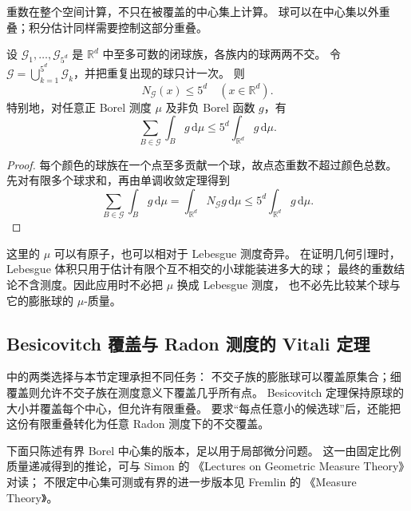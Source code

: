 重数在整个空间计算，不只在被覆盖的中心集上计算。
球可以在中心集以外重叠；积分估计同样需要控制这部分重叠。

\begin{corollary}\label{b1:cor:besicovitch-multiplicity}
设 \(\mathcal G_1,\ldots,\mathcal G_{5^d}\) 是 \(\mathbb R^d\) 中至多可数的闭球族，各族内的球两两不交。
令 \(\mathcal G=\bigcup_{k=1}^{5^d}\mathcal G_k\)，并把重复出现的球只计一次。
则
\[
 N_{\mathcal G}(x)\leq5^d\quad(x\in\mathbb R^d).
\]
特别地，对任意正 Borel 测度 \(\mu\) 及非负 Borel 函数 \(g\)，有
\[
 \sum_{B\in\mathcal G}\int_B g\,\mathrm{d}\mu
 \leq5^d\int_{\mathbb R^d}g\,\mathrm{d}\mu.
\]
\end{corollary}
\begin{proof}
每个颜色的球族在一个点至多贡献一个球，故点态重数不超过颜色总数。
先对有限多个球求和，再由单调收敛定理得到
\[
 \sum_{B\in\mathcal G}\int_Bg\,\mathrm{d}\mu
 =\int_{\mathbb R^d}N_{\mathcal G}g\,\mathrm{d}\mu
 \leq5^d\int_{\mathbb R^d}g\,\mathrm{d}\mu.
\]
\end{proof}

这里的 \(\mu\) 可以有原子，也可以相对于 Lebesgue 测度奇异。
在证明几何引理时，Lebesgue 体积只用于估计有限个互不相交的小球能装进多大的球；
最终的重数结论不含测度。因此应用时不必把 \(\mu\) 换成 Lebesgue 测度，
也不必先比较某个球与它的膨胀球的 \(\mu\)-质量。

\subsection{Besicovitch 覆盖与 Radon 测度的 Vitali 定理}
\label{b1:subsec:130203}

中的两类选择与本节定理承担不同任务：
不交子族的膨胀球可以覆盖原集合；细覆盖则允许不交子族在测度意义下覆盖几乎所有点。
Besicovitch 定理保持原球的大小并覆盖每个中心，但允许有限重叠。
要求“每点任意小的候选球”后，还能把这份有限重叠转化为任意 Radon 测度下的不交覆盖。

\ProseParagraphBreak

下面只陈述有界 Borel 中心集的版本，足以用于局部微分问题。
这一由固定比例质量递减得到的推论，可与 Simon 的%
《Lectures on Geometric Measure Theory》\cite[pp. 23--24, 4.5 REMARKS and 4.6 LEMMA]{Simon1983Lectures}对读；
不限定中心集可测或有界的进一步版本见 Fremlin 的%
《Measure Theory》\cite[472C]{Fremlin2016Measure}。


